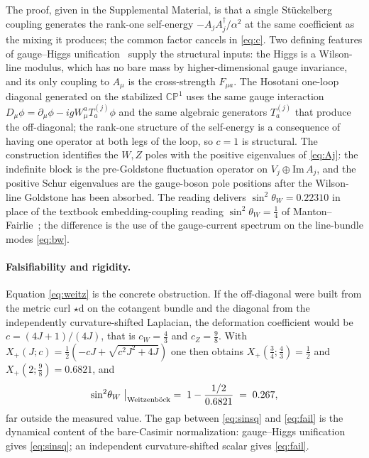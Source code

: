 \documentclass[aps,prl,twocolumn,superscriptaddress,floatfix,nofootinbib,reprint]{revtex4-2}
\newcommand{\Xp}{X_{+}}
\newcommand{\sinsq}{\sin^{2}\!\theta_{W}}
\newcommand{\CP}{\mathbb{CP}}
\newcommand{\dd}{\mathrm{d}}
\begin{document}
The proof, given in the Supplemental Material, is that a single
Stückelberg coupling generates the rank-one self-energy
$-A_{j}A_{j}^{\dagger}/\alpha^{2}$ at the same coefficient as the
mixing it produces; the common factor cancels in \eqref{eq:c}.  Two
defining features of gauge--Higgs
unification~\cite{Manton1979,Fairlie1979,Hosotani1983} supply the
structural inputs: the Higgs is a Wilson-line modulus, which has no
bare mass by higher-dimensional gauge invariance, and its only
coupling to $A_{\mu}$ is the cross-strength $F_{\mu a}$.  The
Hosotani one-loop diagonal generated on the stabilized $\CP^{1}$ uses
the same gauge interaction $D_{\mu}\phi=\partial_{\mu}\phi-igW_{\mu}^{a}T_{a}^{(j)}\phi$ and the same algebraic
generators $T_{a}^{(j)}$ that produce the off-diagonal; the
rank-one structure of the self-energy is a consequence of having one
operator at both legs of the loop, so $c=1$ is structural.  The
construction identifies the $W,Z$ poles with the positive eigenvalues
of \eqref{eq:Aj}: the indefinite block is the pre-Goldstone fluctuation
operator on $V_{j}\oplus\mathrm{Im}\,A_{j}$, and the positive Schur
eigenvalues are the gauge-boson pole positions after the Wilson-line
Goldstone has been absorbed.  The reading delivers $\sinsq=0.22310$ in
place of the textbook embedding-coupling reading $\sinsq=\tfrac14$ of
Manton--Fairlie~\cite{Manton1979,Fairlie1979}; the difference is the
use of the gauge-current spectrum on the line-bundle modes
\eqref{eq:bw}.

\paragraph{Falsifiability and rigidity.}
Equation \eqref{eq:weitz} is the concrete obstruction.  If the
off-diagonal were built from the metric curl
$\star\dd$ on the cotangent bundle and the diagonal from the
independently curvature-shifted Laplacian, the deformation coefficient
would be $c=(4J+1)/(4J)$, that is $c_{W}=\tfrac43$ and $c_{Z}=\tfrac98$.
With $\Xp(J;c)=\tfrac12(-cJ+\sqrt{c^{2}J^{2}+4J})$ one then obtains
$\Xp(\tfrac34;\tfrac43)=\tfrac12$ and $\Xp(2;\tfrac98)=0.6821$, and
\begin{equation}
  \sinsq\bigm|_{\rm Weitzenb\ddot{o}ck}\;=\;1-\frac{1/2}{0.6821}\;=\;0.267,
\label{eq:fail}
\end{equation}
far outside the measured value.  The gap between \eqref{eq:sinsq}
and \eqref{eq:fail} is the dynamical content of the bare-Casimir
normalization: gauge--Higgs unification gives \eqref{eq:sinsq}; an
independent curvature-shifted scalar gives \eqref{eq:fail}.
\end{document}
